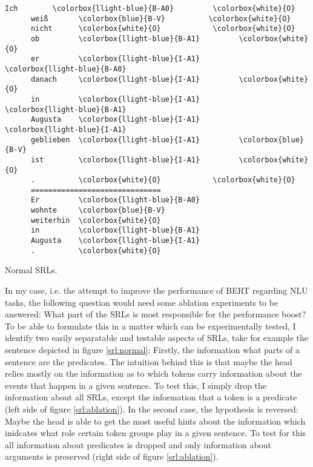 {\begin{minipage}{1.0\linewidth}
  \begin{srl}
  \centering
    \begin{BVerbatim}[commandchars=\\\{\}, fontsize=\footnotesize]
      Ich        \colorbox{llight-blue}{B-A0}         \colorbox{white}{O}
      weiß       \colorbox{blue}{B-V}          \colorbox{white}{O}
      nicht      \colorbox{white}{O}            \colorbox{white}{O}
      ob         \colorbox{llight-blue}{B-A1}         \colorbox{white}{O}
      er         \colorbox{llight-blue}{I-A1}         \colorbox{llight-blue}{B-A0}
      danach     \colorbox{llight-blue}{I-A1}         \colorbox{white}{O}
      in         \colorbox{llight-blue}{I-A1}         \colorbox{llight-blue}{B-A1}
      Augusta    \colorbox{llight-blue}{I-A1}         \colorbox{llight-blue}{I-A1}
      geblieben  \colorbox{llight-blue}{I-A1}         \colorbox{blue}{B-V}
      ist        \colorbox{llight-blue}{I-A1}         \colorbox{white}{O}
      .          \colorbox{white}{O}            \colorbox{white}{O}
      ==============================
      Er         \colorbox{llight-blue}{B-A0}
      wohnte     \colorbox{blue}{B-V}
      weiterhin  \colorbox{white}{O}
      in         \colorbox{llight-blue}{B-A1}
      Augusta    \colorbox{llight-blue}{I-A1}
      .          \colorbox{white}{O}
    \end{BVerbatim}
    \label{srl:normal}
    \caption{Normal SRLs.}
  \end{srl}
\end{minipage}

In my case, i.e. the attempt to improve the performance of BERT regarding NLU tasks, the
following question would need some ablation experiments to be answered: What part of the SRLs
is most responsible for the performance boost? To be able to formulate this in a matter which
can be experimentally tested, I identify two easily separatable and testable aspects of SRLs,
take for example the sentence depicted in figure \ref{srl:normal}: Firstly, the information
what parts of a sentence are the predicates. The intuition behind this is that maybe the
head relies mostly on the information as to which tokens carry information about the events
that happen in a given sentence. To test this, I simply drop the information about all SRLs,
except the information that a token is a predicate (left side of figure \ref{srl:ablation}).
In the second case, the hypothesis is reversed: Maybe the head is able to get the most useful
hints about the information which inidcates what role certain token groups play in a given
sentence. To test for this all information about predicates is dropped and only information
about arguments is preserved (right side of figure \ref{srl:ablation}).

}
